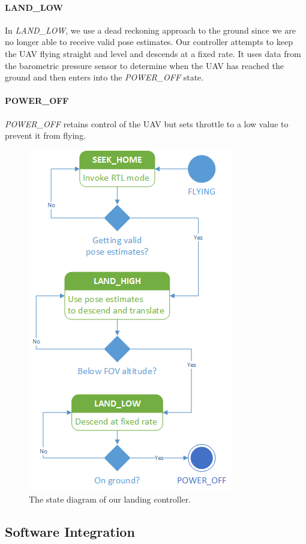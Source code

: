 \documentclass[10pt]{scrartcl} %
\begin{document}
\paragraph{LAND\_LOW}
In \textit{LAND\_LOW}, we use a dead reckoning approach to the ground since we are no longer able to receive valid pose estimates. Our controller attempts to keep the UAV flying straight and level and descends at a fixed rate. It uses data from the barometric pressure sensor to determine when the UAV has reached the ground and then enters into the \textit{POWER\_OFF} state.

\paragraph{POWER\_OFF}
\textit{POWER\_OFF} retains control of the UAV but sets throttle to a low value to prevent it from flying.

\begin{figure}[h]
    \centering
    \includegraphics{images/statediagram.png}
    \caption{The state diagram of our landing controller.}
    \label{fig:statediagram}
\end{figure}

\subsection{Software Integration}
\end{document}
